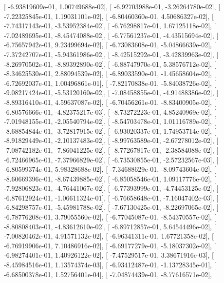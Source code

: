 \documentclass{article}
\begin{document}
       [ -6.93819609e-01,   1.00749688e-02],
       [ -6.92703988e-01,  -3.26264780e-02],
       [ -7.22325845e-01,   1.19031101e-02],
       [ -6.80460360e-01,   4.50686327e-02],
       [ -7.74317143e-01,  -3.53952384e-02],
       [ -6.76298817e-01,   1.67125118e-02],
       [ -7.02489695e-01,  -8.45474088e-02],
       [ -6.77561237e-01,  -4.43515694e-02],
       [ -6.75657942e-01,   9.23499694e-02],
       [ -6.73083608e-01,  -5.04866639e-02],
       [ -7.37242707e-01,  -5.94361986e-02],
       [ -8.42515292e-01,  -3.42839963e-02],
       [ -8.26970502e-01,  -8.89392890e-02],
       [ -6.88747970e-01,   5.38576712e-02],
       [ -8.34625530e-01,   2.88094539e-02],
       [ -6.89033590e-01,  -1.45658604e-02],
       [ -6.72692037e-01,   1.00496861e-01],
       [ -7.82170838e-01,  -5.84038726e-02],
       [ -9.08217424e-01,  -5.53120160e-02],
       [ -7.08458855e-01,  -4.91488386e-02],
       [ -8.89316410e-01,   4.59637087e-02],
       [ -6.70456261e-01,  -8.83400905e-02],
       [ -6.80576666e-01,  -4.82375217e-03],
       [ -8.73272223e-01,   4.85240969e-02],
       [ -7.01948155e-01,  -2.05540794e-02],
       [ -8.54703478e-01,   1.01116789e-02],
       [ -8.68854844e-01,  -3.72817915e-02],
       [ -6.93020337e-01,   1.74953714e-02],
       [ -8.91829449e-01,  -2.10137483e-02],
       [ -8.99763589e-01,  -2.67278012e-02],
       [ -7.08742182e-01,  -7.86041225e-02],
       [ -8.77267817e-01,  -2.38584088e-02],
       [ -6.72466965e-01,  -7.37966829e-02],
       [ -6.73530855e-01,  -2.57232567e-03],
       [ -6.80599374e-01,   5.98328688e-02],
       [ -7.34688629e-01,  -8.09743604e-02],
       [ -8.60669396e-01,  -8.67439885e-02],
       [ -6.85058546e-01,   1.09117776e-02],
       [ -7.92806823e-01,  -4.76441067e-02],
       [ -6.77393999e-01,  -4.74453125e-02],
       [ -6.87612924e-01,  -1.06611324e-01],
       [ -6.76658648e-01,  -7.16047402e-03],
       [ -6.84298757e-01,  -5.45981788e-02],
       [ -7.67130425e-01,  -8.22697065e-02],
       [ -6.78776208e-01,   3.79055560e-02],
       [ -6.77045087e-01,  -8.54370557e-02],
       [ -8.80808403e-01,  -4.83612610e-02],
       [ -6.89712857e-01,   5.64544496e-02],
       [ -7.00820462e-01,   4.91571132e-02],
       [ -6.96341311e-01,   1.67721358e-02],
       [ -6.76919906e-01,   7.10486916e-02],
       [ -6.69177279e-01,  -5.18037302e-02],
       [ -6.98274401e-01,   1.40926122e-02],
       [ -7.47529517e-01,   3.38671916e-03],
       [ -8.45984516e-01,   1.13574374e-03],
       [ -6.93412487e-01,  -1.13728345e-01],
       [ -6.68500378e-01,   1.52756401e-04],
       [ -7.04874439e-01,  -8.77616571e-02],
\end{document}
